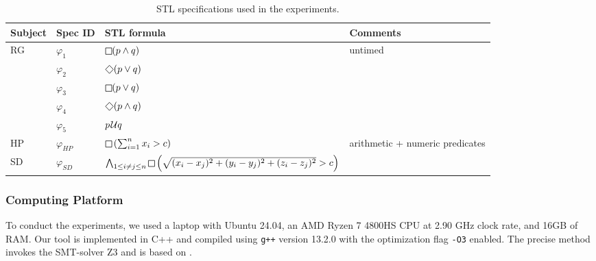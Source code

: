\begin{table}
\centering
\begin{tabular}{|l|l|l|l|}
\hline
Subject & Spec ID & STL formula & Comments \\
\hline
\multirow{ 5}{*}{RG} & $\varphi_1$ & $\LTLg (p \wedge q)$ & \multirow{ 5}{*}{untimed} \\
& $\varphi_2$ & $\LTLf (p \vee q)$ & \\
& $\varphi_3$ & $\LTLg (p \vee q)$ & \\
& $\varphi_4$ & $\LTLf (p \wedge q)$ & \\
& $\varphi_5$ & $p \kern.1em\mathcal{U} q$ & \\
\hline
HP & $\varphi_{HP}$ & $\LTLg \left(\sum_{i=1}^{n} x_i  > c\right)$ & \multirow{ 2}{*}{arithmetic + numeric predicates} \\
SD & $\varphi_{SD}$ & $\bigwedge_{1 \leq i \neq j \leq n} \LTLg \left( \sqrt{(x_i-x_j)^2 + (y_i-y_j)^2 + (z_i-z_j)^2} > c \right)$ &  \\
\hline
\end{tabular}
\caption{STL specifications used in the experiments.}
\label{tab:spec} 
\end{table}

\subsubsection{Computing Platform}

To conduct the experiments, we used a laptop with Ubuntu 24.04, an AMD Ryzen 7 4800HS CPU at 2.90 GHz clock rate, and 16GB of RAM.
Our tool is implemented in C++ and compiled using \texttt{g++} version 13.2.0 with the optimization flag \texttt{-O3} enabled.
The precise method invokes the SMT-solver Z3 \cite{MouraB08} and is based on \cite{MomtazAB23}.

